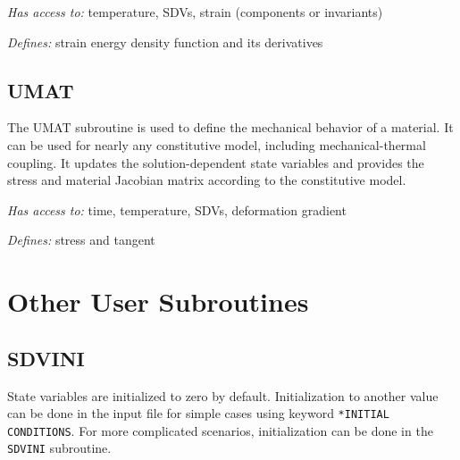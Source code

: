 \documentclass[10pt,letterpaper,oneside]{report}
\begin{document}
\emph{Has access to:} temperature, SDVs, strain (components or invariants)

\emph{Defines:} strain energy density function and its derivatives






\subsection{UMAT}
The UMAT subroutine is used to define the mechanical behavior of a material.  It can be used for nearly any constitutive model, including mechanical-thermal coupling.  It updates the solution-dependent state variables and provides the stress and material Jacobian matrix according to the constitutive model.  

\emph{Has access to:} time, temperature, SDVs, deformation gradient

\emph{Defines:} stress and tangent





\newpage
\section{Other User Subroutines}

\subsection{SDVINI}
State variables are initialized to zero by default.  Initialization to another value can be done in the input file for simple cases using keyword \texttt{*INITIAL CONDITIONS}.  For more complicated scenarios, initialization can be done in the \texttt{SDVINI} subroutine.
\end{document}
